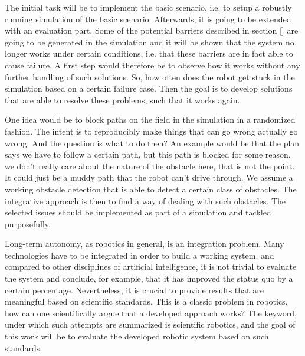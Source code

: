 \documentclass[german, master, expose, latin1]{base/thesis_KBS}
\begin{document}
The initial task will be to implement the basic scenario, i.e. to setup a robustly running simulation of the basic scenario.
Afterwards, it is going to be extended with an evaluation part. Some of the potential barriers described in section \ref{} are going to be generated
in the simulation and it will be shown that the system no longer works under certain conditions, i.e. that these barriers are in fact able to cause failure.
A first step would therefore be to observe how it works without any further handling of such solutions. So, how often does the robot get stuck in the simulation 
based on a certain failure case. Then the goal is to develop solutions that are able to resolve these problems, such that it works again.\newline

One idea would be to block paths on the field in the simulation in a randomized fashion. The intent is to reproducibly make things that can go wrong actually go wrong.
And the question is what to do then? An example would be that the plan says we have to follow a certain path, but this path is blocked for some reason, we don't really
care about the nature of the obstacle here, that is not the point. It could just be a muddy path that the robot can't drive through. We assume a working obstacle detection
that is able to detect a certain class of obstacles. The integrative approach is then to find a way of dealing with such obstacles.
The selected issues should be implemented as part of a simulation and tackled purposefully.\newline

Long-term autonomy, as robotics in general, is an integration problem. Many technologies have to be integrated in order to build a working system, and compared to
other disciplines of artificial intelligence, it is not trivial to evaluate the system and conclude, for example, that it has improved the status quo by a certain percentage.
Nevertheless, it is crucial to provide results that are meaningful based on scientific standards. This is a classic problem in robotics, 
how can one scientifically argue that a developed approach works? The keyword, under which such attempts are summarized is scientific robotics, 
and the goal of this work will be to evaluate the developed robotic system based on such standards.\newline
\end{document}
